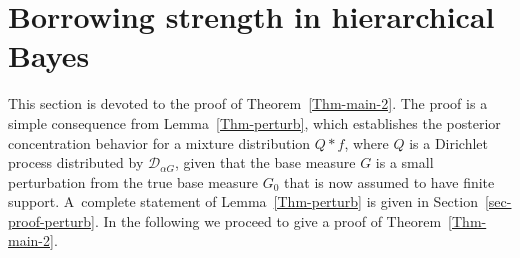 \documentclass[MSNbibl,number,citesort]{arxbj}
\newcommand{\eqref}[1]{(\ref{#1})}
\def\comment{}
\newcommand{\DP}{\mathscr{D}}
\newcommand{\epsmn}{\varepsilon_{mn}}
\begin{document}




\section{Borrowing strength in hierarchical Bayes}
\label{Sec-perturb}

This section is devoted to the proof of Theorem~\ref{Thm-main-2}.
The proof is a simple consequence from Lemma~\ref{Thm-perturb},
which establishes the posterior concentration behavior for a
mixture distribution $Q*f$, where $Q$ is a Dirichlet process
distributed by $\DP_{\alpha G}$, given that
the base measure $G$ is a small perturbation from the true
base measure $G_0$ that is now assumed to have finite support.
A~complete statement of Lemma~\ref{Thm-perturb}
is given in Section~\ref{sec-proof-perturb}.
In the following we proceed to give a proof of Theorem~\ref{Thm-main-2}.
\end{document}
